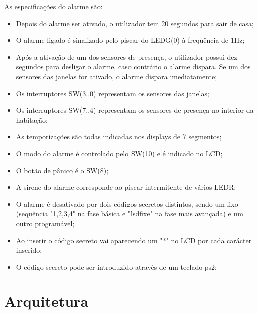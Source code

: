 \documentclass{report}
\begin{document}
As especificações do alarme são:
	\begin{itemize}
		\item Depois do alarme ser ativado, o utilizador tem 20 segundos para sair de casa;
		
		\item O alarme ligado é sinalizado pelo piscar do LEDG(0) à frequência de 1Hz;
		
		\item Após a ativação de um dos sensores de presença, o utilizador possui dez segundos para desligar o alarme, caso contrário o alarme dispara. Se um dos sensores das janelas for ativado, o alarme dispara imediatamente;
		
		\item Os interruptores SW(3..0) representam os sensores das janelas;
		
		\item Os interruptores SW(7..4) representam os sensores de presença no interior da habitação; 
		
		\item As temporizações são todas indicadas nos displays de 7 segmentos;
		
		\item O modo do alarme é controlado pelo SW(10) e é indicado no LCD;
		
		\item O botão de pânico é o SW(8);
		
		\item A sirene do alarme corresponde ao piscar intermitente  de vários LEDR;
		
		\item  O alarme é desativado por dois códigos secretos distintos, sendo um fixo (sequência "1,2,3,4" na fase básica e "lsdfixe" na fase mais avançada) e um outro programável;
		
		\item Ao inserir o código secreto vai aparecendo um "*" no LCD por cada carácter inserido;
		
		\item O código secreto pode ser introduzido através de um teclado ps2;
		 
	\end{itemize}

	

\chapter{Arquitetura}
\label{chap.arquitetura}
\end{document}
